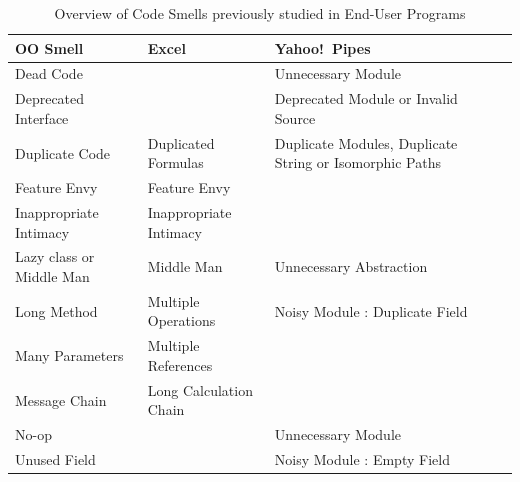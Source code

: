 \documentclass[conference]{IEEEtran}
\renewcommand*\cmidrule{\midrule[0.001em]} %
\begin{document}
\begin{table}
\begin{center}
\caption{Overview of Code Smells previously studied in End-User Programs
\label{table:oosmellslarge}}
\sffamily
\begin{tabular} {@{}llll@{}}
\toprule
\textbf{OO Smell}
	& \textbf{Excel}
	& \textbf{Yahoo!\ Pipes}
\\ \midrule
Dead Code
	& %
	& Unnecessary Module \cite{StoleeTSE2013}
\\ \cmidrule
Deprecated Interface
	& %
	& Deprecated Module or Invalid Source \cite{StoleeTSE2013}

\\ \cmidrule
Duplicate Code
	& Duplicated Formulas \cite{Hermans2012intra}
	& Duplicate Modules, Duplicate String or Isomorphic Paths \cite{StoleeTSE2013}
\\ \cmidrule
Feature Envy
	& Feature Envy \cite{Hermans2012inter}
	& %
\\ \cmidrule
Inappropriate Intimacy
	& Inappropriate Intimacy \cite{Hermans2012inter}
	& %
\\ \cmidrule
Lazy class or Middle Man
	& Middle Man \cite{Hermans2012inter}
	& Unnecessary Abstraction \cite{StoleeTSE2013}
\\ \cmidrule
Long Method
	& Multiple Operations \cite{Hermans2012intra}
	& Noisy Module : Duplicate Field \cite{StoleeTSE2013}
\\ \cmidrule
Many Parameters
	& Multiple References \cite{Hermans2012intra}
	& 
\\ \cmidrule
Message Chain
	& Long Calculation Chain \cite{Hermans2012intra}
	& 
\\ \cmidrule
No-op
	& %
	& Unnecessary Module \cite{StoleeTSE2013}
\\ \cmidrule
Unused Field
	& %
	& Noisy Module : Empty Field \cite{StoleeTSE2013}
\\ \bottomrule
\end{tabular}
\end{center}
\end{table}
\end{document}
